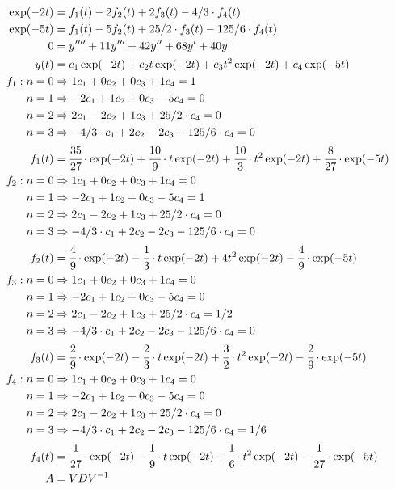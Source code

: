 \documentclass[12pt,a4paper]{article}
\begin{document}
\begin{align}
\exp (-2t) &= f_1(t) - 2 f_2(t) + 2 f_3(t) - 4/3\cdot f_4(t) \\
\exp (-5t) &= f_1(t) - 5 f_2(t) + 25/2\cdot f_3(t) - 125/6\cdot f_4(t) \\
0 &= y'''' + 11 y''' + 42 y'' + 68 y' + 40 y \\
y(t) &= c_1 \exp(-2t) + c_2 t \exp(-2t) + c_3 t^2 \exp(-2t) + c_4 \exp(-5t) \\
f_1: n = 0 &\Rightarrow 1 c_1 + 0 c_2 + 0 c_3 + 1 c_4 = 1  \\
n = 1 &\Rightarrow -2 c_1 + 1 c_2 + 0 c_3 - 5 c_4 = 0  \\
n = 2 &\Rightarrow 2 c_1 - 2 c_2 + 1 c_3 + 25/2\cdot c_4 = 0 \\
n = 3 &\Rightarrow - 4/3\cdot c_1 + 2 c_2 - 2 c_3 - 125/6\cdot c_4 = 0  \\
f_1(t) &= \cfrac{35}{27}\cdot \exp(-2t) + \cfrac{10}{9}\cdot t \exp(-2t) +\cfrac{10}{3}\cdot t^2 \exp(-2t) +\cfrac{8}{27}\cdot \exp(-5t) \\
f_2: n = 0 &\Rightarrow 1 c_1 + 0 c_2 + 0 c_3 + 1 c_4 = 0  \\
n = 1 &\Rightarrow -2 c_1 + 1 c_2 + 0 c_3 - 5 c_4 = 1  \\
n = 2 &\Rightarrow 2 c_1 - 2 c_2 + 1 c_3 + 25/2\cdot c_4 = 0 \\
n = 3 &\Rightarrow - 4/3\cdot c_1 + 2 c_2 - 2 c_3 - 125/6\cdot c_4 = 0  \\
f_2(t) &= \cfrac{4}{9}\cdot \exp(-2t) - \cfrac{1}{3}\cdot t \exp(-2t) + 4 t^2 \exp(-2t) - \cfrac{4}{9}\cdot \exp(-5t) \\
f_3: n = 0 &\Rightarrow 1 c_1 + 0 c_2 + 0 c_3 + 1 c_4 = 0  \\
n = 1 &\Rightarrow -2 c_1 + 1 c_2 + 0 c_3 - 5 c_4 = 0  \\
n = 2 &\Rightarrow 2 c_1 - 2 c_2 + 1 c_3 + 25/2\cdot c_4 = 1/2 \\
n = 3 &\Rightarrow - 4/3\cdot c_1 + 2 c_2 - 2 c_3 - 125/6\cdot c_4 = 0  \\
f_3(t) &= \cfrac{2}{9}\cdot \exp(-2t) - \cfrac{2}{3}\cdot t \exp(-2t) +\cfrac{3}{2}\cdot t^2 \exp(-2t) -\cfrac{2}{9}\cdot \exp(-5t) \\
f_4: n = 0 &\Rightarrow 1 c_1 + 0 c_2 + 0 c_3 + 1 c_4 = 0  \\
n = 1 &\Rightarrow -2 c_1 + 1 c_2 + 0 c_3 - 5 c_4 = 0  \\
n = 2 &\Rightarrow 2 c_1 - 2 c_2 + 1 c_3 + 25/2\cdot c_4 = 0 \\
n = 3 &\Rightarrow - 4/3\cdot c_1 + 2 c_2 - 2 c_3 - 125/6\cdot c_4 = 1/6  \\
f_4(t) &= \cfrac{1}{27}\cdot \exp(-2t) - \cfrac{1}{9}\cdot t \exp(-2t) +\cfrac{1}{6}\cdot t^2 \exp(-2t) -\cfrac{1}{27}\cdot \exp(-5t) \\
A &= VDV^{-1}
\end{align}
\end{document}
